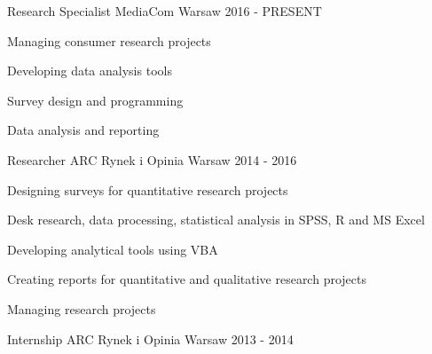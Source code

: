 \begin{cventries}
  \cventry
    {Research Specialist}
    {MediaCom}
    {Warsaw}
    {2016 - PRESENT}
    {
      \begin{cvitems}
        \item {Managing consumer research projects}
        \item {Developing data analysis tools}
        \item {Survey design and programming}
        \item {Data analysis and reporting}
      \end{cvitems}
    }
  \cventry
    {Researcher}
    {ARC Rynek i Opinia}
    {Warsaw}
    {2014 - 2016}
    {
      \begin{cvitems}
        \item {Designing surveys for quantitative research projects}
        \item {Desk research, data processing, statistical analysis in SPSS, R and MS Excel}
        \item {Developing analytical tools using VBA}
        \item {Creating reports for quantitative and qualitative research projects}
        \item {Managing research projects}
      \end{cvitems}
    }
  \cventryshort
    {Internship}
    {ARC Rynek i Opinia}
    {Warsaw}
    {2013 - 2014}
\end{cventries}

